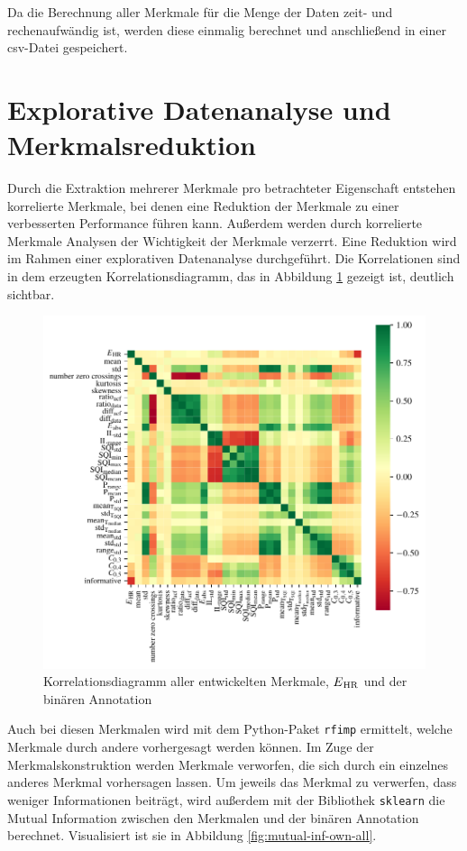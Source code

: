 Da die Berechnung aller Merkmale für die Menge der Daten zeit- und rechenaufwändig ist, werden diese einmalig berechnet und anschließend in einer csv-Datei gespeichert.

\section{Explorative Datenanalyse und Merkmalsreduktion}\label{reduction}

Durch die Extraktion mehrerer Merkmale pro betrachteter Eigenschaft entstehen korrelierte Merkmale, bei denen eine Reduktion der Merkmale zu einer verbesserten Performance führen kann. Außerdem werden durch korrelierte Merkmale Analysen der Wichtigkeit der Merkmale verzerrt. Eine Reduktion wird im Rahmen einer explorativen Datenanalyse durchgeführt. %
Die Korrelationen sind in dem erzeugten Korrelationsdiagramm, das in Abbildung \ref{fig:corr-heatmap-own} gezeigt ist, deutlich sichtbar.

\begin{figure}[H]
	\centering
	\includegraphics{pic/corr-heatmap-own.pdf}
	\caption{Korrelationsdiagramm aller entwickelten Merkmale, $E\textsubscript{HR}$ und der binären Annotation}
	\label{fig:corr-heatmap-own}
\end{figure}
 
Auch bei diesen Merkmalen wird mit dem Python-Paket \texttt{rfimp} ermittelt, welche Merkmale durch andere vorhergesagt werden können. Im Zuge der Merkmalskonstruktion werden Merkmale verworfen, die sich durch ein einzelnes anderes Merkmal vorhersagen lassen. Um jeweils das Merkmal zu verwerfen, dass weniger Informationen beiträgt, wird außerdem mit der Bibliothek \texttt{sklearn} die Mutual Information zwischen den Merkmalen und der binären Annotation berechnet. Visualisiert ist sie in Abbildung \ref{fig:mutual-inf-own-all}.

